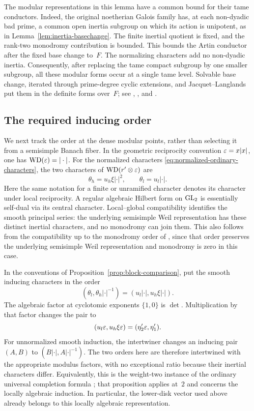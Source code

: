 The modular representations in this lemma have a common bound for
their tame conductors.  Indeed, the original noetherian Galois family
has, at each non-dyadic bad prime, a common open inertia subgroup on
which its action is unipotent, as in
Lemma~\ref{lem:inertia-basechange}.  The finite inertial quotient is
fixed, and the rank-two monodromy contribution is bounded.  This bounds
the Artin conductor after the fixed base change to~$F$.
The normalizing characters add no non-dyadic inertia.  Consequently,
after replacing the tame compact subgroup by one smaller subgroup,
all these modular forms occur at a single tame level.  Solvable base
change, iterated through prime-degree cyclic extensions, and
Jacquet--Langlands put them in the definite forms over~$F$;
see \cite[Chapter~11, Lemma~11.3 and Proposition~11.4]{Langlands1980},
\cite[Chapter~III, Theorems~4.2 and~5.1]{ArthurClozel1989}, and
\cite[Theorem~16.1]{JacquetLanglands1970}.

\subsection{The required inducing order}

We next track the order at the dense modular points, rather than
selecting it from a semisimple Banach fiber.  In the geometric
reciprocity convention $\varepsilon=x|x|$, one has $\operatorname{WD}(\varepsilon)=|\cdot|$.
For the normalized characters \eqref{eq:normalized-ordinary-characters},
the two characters of $\operatorname{WD}(r'\otimes\varepsilon)$ are
\[
              \theta_h=u_h\xi|\cdot|^2,
          \qquad\theta_l=u_l|\cdot|.
\]
Here the same notation for a finite or unramified character denotes
its character under local reciprocity.  A regular algebraic Hilbert
form on $\operatorname{GL}_2$ is essentially self-dual via its central character.
Local--global compatibility
identifies the smooth principal series: the underlying semisimple Weil
representation has these distinct inertial characters, and no
monodromy can join them.  This also follows from the compatibility up
to the monodromy order of
\cite[Corollary~1.2]{BLGGTLocalGlobal2014}, since that order preserves
the underlying semisimple Weil representation and monodromy is zero
in this case.

In the conventions of Proposition~\ref{prop:block-comparison}, put the
smooth inducing characters in the order
\[
 (\theta_l,\theta_h|\cdot|^{-1})
             =(u_l|\cdot|,u_h\xi|\cdot|).
\]
The algebraic factor at cyclotomic exponents $\{1,0\}$ is $\det$.
Multiplication by that factor changes the pair to
\[
                 (u_l\varepsilon,u_h\xi\varepsilon)
                         =(\eta'_2\varepsilon,\eta'_1).
\]
For unnormalized smooth induction, the intertwiner changes an inducing
pair $(A,B)$ to $(B|\cdot|,A|\cdot|^{-1})$.  The two orders here are
therefore intertwined with the appropriate modulus factors, with no
exceptional ratio because their inertial characters differ.
Equivalently, this is the
weight-two instance of the ordinary universal completion formula
\cite[Proposition~2.2.1]{BreuilEmerton2010}; that proposition applies
at~$2$ and concerns the locally algebraic induction.
In particular, the lower-disk vector used above already belongs to
this locally algebraic representation.

